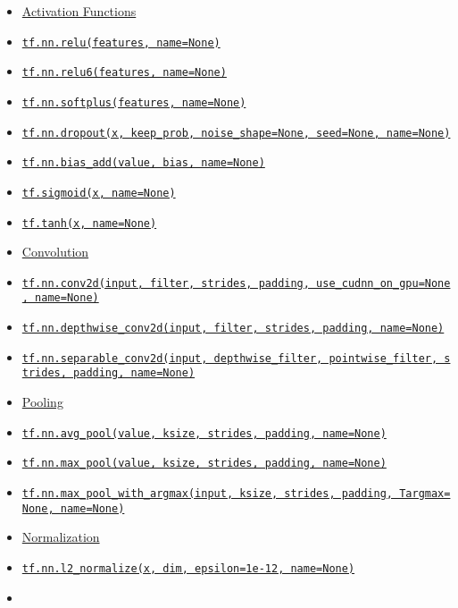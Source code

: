 \begin{itemize}
\tightlist
\item
  \protect\hyperlink{AUTOGENERATED-activation-functions}{Activation
  Functions}
\item
  \protect\hyperlink{relu}{\texttt{tf.nn.relu(features,\ name=None)}}
\item
  \protect\hyperlink{relu6}{\texttt{tf.nn.relu6(features,\ name=None)}}
\item
  \protect\hyperlink{softplus}{\texttt{tf.nn.softplus(features,\ name=None)}}
\item
  \protect\hyperlink{dropout}{\texttt{tf.nn.dropout(x,\ keep\_prob,\ noise\_shape=None,\ seed=None,\ name=None)}}
\item
  \protect\hyperlink{biasux5fadd}{\texttt{tf.nn.bias\_add(value,\ bias,\ name=None)}}
\item
  \protect\hyperlink{sigmoid}{\texttt{tf.sigmoid(x,\ name=None)}}
\item
  \protect\hyperlink{tanh}{\texttt{tf.tanh(x,\ name=None)}}
\item
  \protect\hyperlink{AUTOGENERATED-convolution}{Convolution}
\item
  \protect\hyperlink{conv2d}{\texttt{tf.nn.conv2d(input,\ filter,\ strides,\ padding,\ use\_cudnn\_on\_gpu=None,\ name=None)}}
\item
  \protect\hyperlink{depthwiseux5fconv2d}{\texttt{tf.nn.depthwise\_conv2d(input,\ filter,\ strides,\ padding,\ name=None)}}
\item
  \protect\hyperlink{separableux5fconv2d}{\texttt{tf.nn.separable\_conv2d(input,\ depthwise\_filter,\ pointwise\_filter,\ strides,\ padding,\ name=None)}}
\item
  \protect\hyperlink{AUTOGENERATED-pooling}{Pooling}
\item
  \protect\hyperlink{avgux5fpool}{\texttt{tf.nn.avg\_pool(value,\ ksize,\ strides,\ padding,\ name=None)}}
\item
  \protect\hyperlink{maxux5fpool}{\texttt{tf.nn.max\_pool(value,\ ksize,\ strides,\ padding,\ name=None)}}
\item
  \protect\hyperlink{maxux5fpoolux5fwithux5fargmax}{\texttt{tf.nn.max\_pool\_with\_argmax(input,\ ksize,\ strides,\ padding,\ Targmax=None,\ name=None)}}
\item
  \protect\hyperlink{AUTOGENERATED-normalization}{Normalization}
\item
  \protect\hyperlink{l2ux5fnormalize}{\texttt{tf.nn.l2\_normalize(x,\ dim,\ epsilon=1e-12,\ name=None)}}
\item

\end{itemize}
